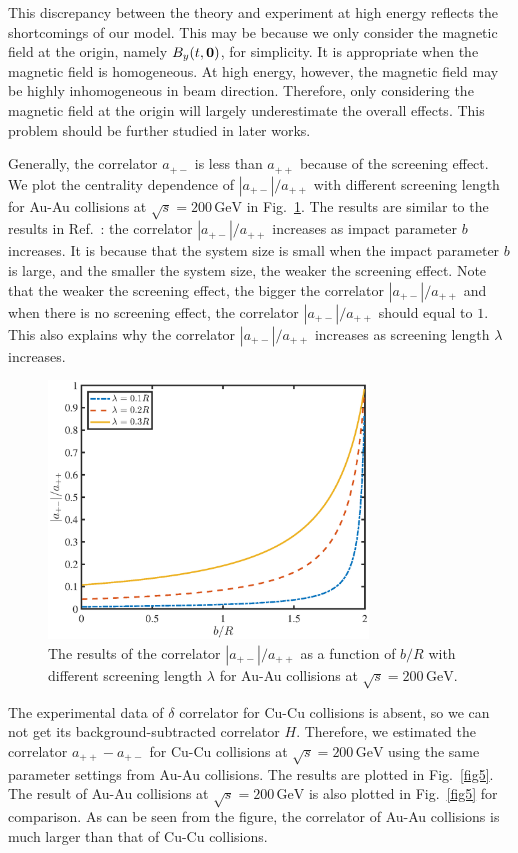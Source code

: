 \documentclass[preprint]{elsarticle}
\begin{document}
This discrepancy between the theory and experiment at high energy reflects the shortcomings of our model. This may be because we only consider the magnetic field at the origin, namely $B_y(t,\vb{0})$, for simplicity. It is appropriate when the magnetic field is homogeneous. At high energy, however, the magnetic field may be highly inhomogeneous in beam direction. Therefore, only considering the magnetic field at the origin will largely underestimate the overall effects. This problem should be further studied in later works.

Generally, the correlator $a_{+-}$ is less than $a_{++}$ because of the screening effect. We plot the centrality dependence of $|a_{+-}|/a_{++}$ with different screening length for Au-Au collisions at $\sqrt{s} = 200\,\mathrm{GeV}$ in Fig.~\ref{fig4}. The results are similar to the results in Ref.~\cite{Kharzeev:2007jp}: the correlator $|a_{+-}|/a_{++}$ increases as impact parameter $b$ increases. It is because that the system size is small when the impact parameter $b$ is large, and the smaller the system size, the weaker the screening effect. Note that the weaker the screening effect, the bigger the correlator $|a_{+-}|/a_{++}$ and when there is no screening effect, the correlator $|a_{+-}|/a_{++}$ should equal to $1$. This also explains why the correlator $|a_{+-}|/a_{++}$ increases as screening length $\lambda$ increases.


\begin{figure}
\centering
\includegraphics[width=8.5cm]{fig4.eps}
\caption{\label{fig4}The results of the correlator $|a_{+-}|/a_{++}$ as a function of $b/R$ with different screening length $\lambda$ for Au-Au collisions at $\sqrt{s} = 200\,\mathrm{GeV}$.}
\end{figure}

The experimental data of $\delta$ correlator for Cu-Cu collisions is absent, so we can not get its background-subtracted correlator $H$. Therefore, we estimated the correlator $a_{++} - a_{+-}$ for Cu-Cu collisions at $\sqrt{s} = 200\,\mathrm{GeV}$ using the same parameter settings from Au-Au collisions. The results are plotted in Fig.~\ref{fig5}. The result of Au-Au collisions at $\sqrt{s} = 200\,\mathrm{GeV}$ is also plotted in Fig.~\ref{fig5} for comparison. As can be seen from the figure, the correlator of Au-Au collisions is much larger than that of Cu-Cu collisions.
\end{document}
